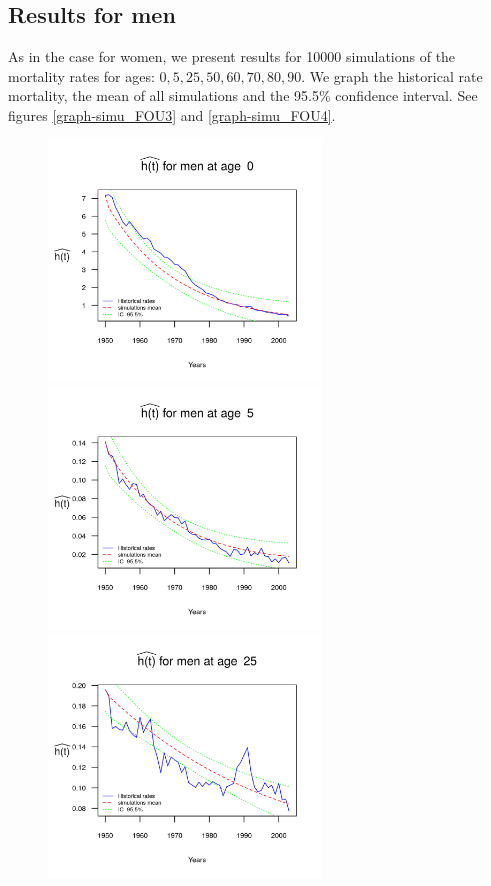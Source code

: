 \documentclass[smallextended]{svjour3}
\begin{document}
\subsection{Results for men}\label{re-men}

As in the case for women, we present results for 10000 simulations of the
mortality rates for ages: $0,5,25,50,60,70,80,90$.
We graph the historical rate mortality, the mean of all simulations and the
95.5\% confidence interval. See figures \ref{graph-simu_FOU3} and
\ref{graph-simu_FOU4}.\\



\begin{figure}[H]
    \includegraphics[width = 2.85in]{PlotMen0.png}
    \includegraphics[width = 2.85in]{PlotMen5.png}
    \includegraphics[width = 2.85in]{PlotMen25.png}

\end{figure}
\end{document}
